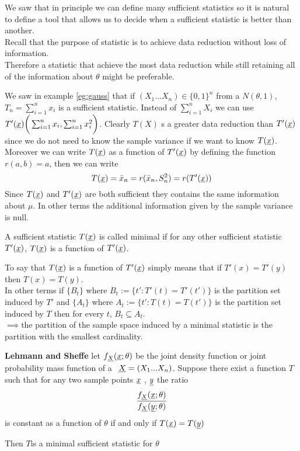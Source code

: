 We saw that in principle we can define many sufficient statistics so it is natural to define a tool that allows us to decide when a sufficient statistic is better than another.\\
Recall that the purpose of statistic is to achieve data reduction without loss of information.\\
Therefore a statistic that achieve the most data reduction while still retaining all of the information about $\theta$ might be preferable.
\begin{oss}
	We saw in example \ref{eg:gauss} that if 	$(X_1... X_n)\in \{0,1\}^n$ from a $N(\theta,1)$,  $T_n=\sum_{i=1}^{n} x_i$ is a sufficient statistic. Instead of $\sum_{i=1}^{n} X_i$ we can use $T'(\underline x)\bigg( \sum_{i=1}^{n} x_i, \sum_{i=1}^{n} x_i^2 \bigg)$. Clearly $T(X)$ s a greater data reduction than $T'(\underline x)$ since we do not need to know the sample variance if we want to know $T(\underline x)$. Moreover we can write $T(\underline x)$ as a function of $T'(\underline x)$ by defining the function $r(a,b)=a$, then we can write
	$$T(\underline x)=\bar x_n=r(\bar x_n, S^2_n)=r(T'(\underline x))$$
	Since $T(\underline x)$ and $T'(\underline x)$ are both sufficient they contains the same information about $\mu$.
	In other terms the additional information given by the sample variance is null.
\end{oss} 
\begin{defi}
	A sufficient statistic $T(\underline x)$ is called minimal if for any other sufficient statistic $T'(\underline x)$, $T(\underline x)$ is a function of $T'(\underline x)$. 
\end{defi}
To say that $T(\underline x)$  is a function of  $T'(\underline x)$ simply means that if $T'(x)=T'(y)$ then $T(x)=T(y)$.\\
In other terms if $\{ B_t\} $ where $B_t:=\{t' : T'(t)=T'(t') \}$ is the partition set induced by $T'$ and $\{ A_t\} $ where $A_t:=\{t' : T(t)=T(t') \}$ is the partition set induced by $T$ then for every $t$, $B_t \subseteq A_t$.\\
$\implies$the partition of the sample space induced by a minimal statistic is the partition with the smallest cardinality.
\begin{teo}\textbf{Lehmann and Sheffe}
	let $f_{\underline X}(\underline{x};\theta)$ be the joint density function or joint probability mass function of a \rs \  $\underline X=(X_1...X_n)$. Suppose there exist a function $T$ such that for any two sample points $\underline x$ , $\underline y$ the ratio 
	\[
	\frac{f_{\underline X}(\underline{x};\theta)}{f_{\underline X}(\underline y;\theta)}
	\]
	is constant as a function of $\theta$ if and only if $T(\underline x)=T(\underline y)$
	
	
	Then $T$is a minimal sufficient statistic for $\theta$ 
\end{teo}


